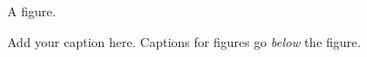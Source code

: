 %
%
%
\begin{figure}[t]
    \centering

    A figure.

    \caption{
        \label{fig:plain-figure}
        Add your caption here. Captions for figures go {\em below}
        the figure.
    }
\end{figure}